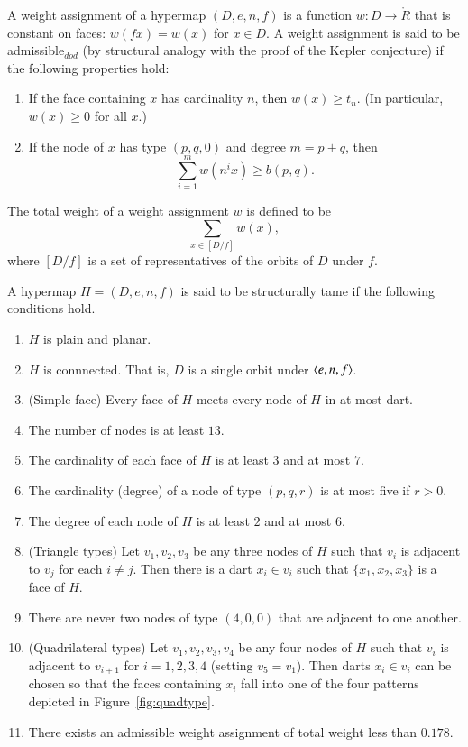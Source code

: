 A weight assignment of a hypermap $(D,e,n,f)$ is a function $w:D \to \ring{R}$ that
is constant on faces: $w(f x) = w(x)$ for $x\in D$.  A weight assignment is said to be
admissible$_{dod}$ (by structural analogy with the proof of the Kepler conjecture)
if the following properties hold:
\begin{enumerate}
\item If the face containing $x$ has cardinality $n$, then $w(x)\ge t_n$.
(In particular, $w(x)\ge0$ for all $x$.)
\item If the node of $x$ has type $(p,q,0)$ and degree $m=p+q$, then
  $$
  \sum_{i=1}^m w(n^i x) \ge b(p,q).
  $$
\end{enumerate}
The total weight of a weight assignment $w$ is defined to be
$$
\sum_{x\in [D/f]}  w(x),
$$
where $[D/f]$ is a set of representatives of the orbits of $D$ under $f$.


\begin{definition}
A hypermap $H=(D,e,n,f)$ is said to be structurally tame if the following conditions
hold.
\begin{enumerate}
\item $H$ is plain and planar.
\item $H$ is connnected.  That is, $D$ is a single orbit under $\langle e,n,f\rangle$.
\item (Simple face) Every face of $H$ meets every node of $H$ in at most
dart.
\item The number of nodes is at least $13$.
\item The cardinality of each face of $H$ is at least $3$ and at most $7$.
\item The cardinality (degree) of a node of type $(p,q,r)$ is at most five if $r>0$.
\item The degree of each node of $H$ is at least $2$ and at most $6$.
\item (Triangle types) Let $v_1,v_2,v_3$ be any three nodes of $H$ such that $v_i$ is adjacent to $v_j$
for each $i\ne j$.  Then there is a dart $x_i\in v_i$ such that $\{x_1,x_2,x_3\}$ is
a face of $H$.
\item There are never two nodes of type $(4,0,0)$ that are adjacent to one another.
\item (Quadrilateral types) 
Let $v_1,v_2,v_3,v_4$ be any four nodes of $H$ such that $v_i$ is adjacent
to $v_{i+1}$ for $i=1,2,3,4$ (setting $v_5=v_1$).  Then darts $x_i\in v_i$ can be chosen
so that the faces containing $x_i$ fall into one of the four patterns depicted
in Figure~\ref{fig:quadtype}.
\item There exists an admissible weight assignment of total weight less than $0.178$.
\end{enumerate}
\end{definition}

